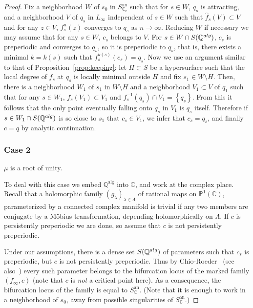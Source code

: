 \documentclass[11 pt, oneside, a4paper]{amsart}
\newcommand{\C}{\mathbb{C}}
\newcommand{\Q}{\mathbb{Q}}
\renewcommand{\P}{\mathbb{P}}
\newcommand{\set}[1]{{\left\{#1\right\}}}
\DeclareMathOperator{\an}{an}
\DeclareMathOperator{\alg}{alg}
\newcommand{\la}{\lambda}
\newcommand{\inv}{^{-1}}
\theoremstyle{definition}
\theoremstyle{definition}
\begin{document}
\begin{proof}
Fix  a neighborhood $W$ of $s_0$ in $S^{\an}_{\C_v}$ such that for $s\in W$,  $q_s$ is attracting, 
and  a neighborhood   
$V$ of $q_s$ in $L_\infty$ independent of $s\in W$ such that $\hat{f}_s(V)\subset V$ and 
for any $z\in V$, $f^n_s(z)$ converges to $q_s$ as $n\to\infty$. Reducing $W$ if necessary we may assume that for any 
$s\in W$, $c_s$ belongs to $V$. For $s\in W\cap S(\Q^{\rm alg})$, $c_s$ is preperiodic and converges to $q_s$, 
so it is preperiodic to $q_s$, that is, there exists a minimal  $k=k(s)$ such that $f_s^{k(s)}(c_s) = q_s$.  Now we use an argument similar to that of Proposition~\ref{prop:keeping}: let $H\subset S$ be a hypersurface such that the local degree of $f_s$ at $q_s$ is locally minimal outside $H$ and fix $s_1 \in W\setminus H$. Then, there is a neighborhood $W_1$ of $s_1$ in $W\setminus H$
and a neighborhood $V_1\subset V$ of $q_1$ such that for any $s\in W_1$, 
$f_{s}(V_1)\subset V_1$ and $f_s\inv(q_s)\cap V_1 = \set{q_s}$. From this it follows that the only point eventually falling onto 
$q_s$ in $V_1$ is $q_s$ itself. Therefore if  $s\in W_1\cap S(\Q^{\rm alg})$ is so close to $s_1$ that 
$c_s \in V_1$, we infer that  $c_s = q_s$, and finally  $c=q$ by analytic continuation. 

\subsubsection*{Case 2}
$\mu$ is   a root of unity. 

To deal with this case we embed $\Q^{\alg}$ into $\C$, and work at the complex place. Recall that a holomorphic family $(g_\lambda)_{\la\in \Lambda}$ of rational maps on $\P^1(\C)$, parameterized by a connected complex manifold is trivial if any two members are conjugate by a Möbius transformation, depending holomorphically on $\Lambda$. If $c$ is persistently preperiodic we are done, so assume that 
$c$ is not persistently preperiodic.  

Under our assumptions,   
there is a dense set $S(\Q^{\rm alg})$ of parameters such that $c_s$ is preperiodic, but $c$ 
is not persistently preperiodic.  Thus by Chio-Roeder~\cite[Theorem 2.7]{chio-roeder} (see also~\cite[Theorem 4]{preper})
every such parameter belongs to the 
 bifurcation locus of the marked  family $(f_\infty, c)$ (note that $c$ is \emph{not} a critical point here). 
 As a consequence,  the bifurcation locus  of the   family is equal to $S^{\an}_\C$. 
 (Note that it is enough to work in a neighborhood 
 of $s_0$, away from possible singularities of $S^{\an}_\C$.)
 

\end{proof}
\end{document}
